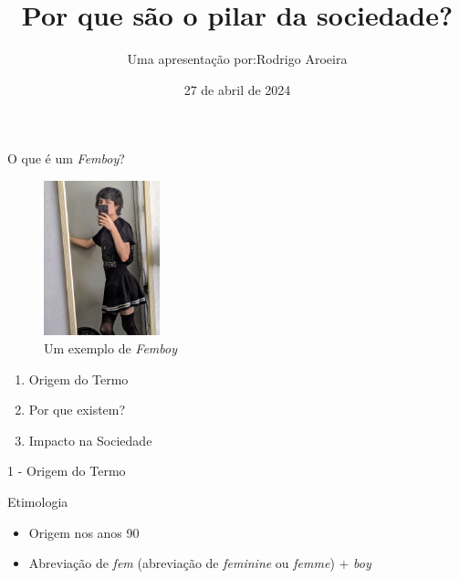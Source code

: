 \documentclass{beamer}
\title{Por que \femboys{} são o pilar da sociedade?}
\author{Uma apresentação por:\newline Rodrigo Aroeira}
\date{27 de abril de 2024}
\newcommand{\femboy}{\textit{Femboy}}
\newcommand{\addNewlines}[1]{\vspace*{#1\baselineskip}}
\begin{document}
\maketitle


\begin{frame}{\begin{center}
    \Large{O que é um \femboy?}
\end{center}}

\begin{figure}
    \includegraphics[width=0.3\textwidth]{femboy.jpg}
    \caption{Um exemplo de \femboy}
\end{figure}

\end{frame}

\begin{frame}{}
   \begin{enumerate}
    \item Origem do Termo
    \item Por que existem?
    \item Impacto na Sociedade
   \end{enumerate} 
\end{frame}


\begin{frame}{1 - Origem do Termo}
\begin{center}
    \Huge{Etimologia}
    \addNewlines{3}
\end{center}

\begin{itemize}
    \item Origem nos anos 90
    \item Abreviação de \textit{fem} (abreviação de \textit{feminine} ou \textit{femme}) + \textit{boy}
\end{itemize}

\end{frame}

\end{document}
